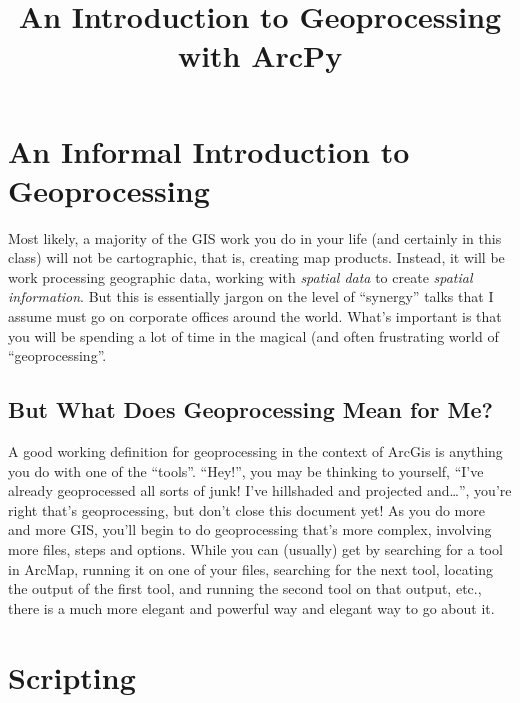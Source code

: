 \documentclass{article}
\begin{document}
\title{An Introduction to Geoprocessing with ArcPy}
\maketitle

\section{An Informal Introduction to Geoprocessing}
Most likely, a majority of the GIS work you do in your life (and certainly in this class) will not be cartographic, that is, creating map products.  Instead, it will be work processing geographic data, working with \textit{spatial data} to create \textit{spatial information}.  But this is essentially jargon on the level of ``synergy'' talks that I assume must go on corporate offices around the world.  What's important is that you will be spending a lot of time in the magical (and often frustrating world of ``geoprocessing''.  
\subsection{But What Does Geoprocessing Mean for Me?}
A good working definition for geoprocessing in the context of ArcGis is anything you do with one of the ``tools''.  ``Hey!'', you may be thinking to yourself, ``I've already geoprocessed all sorts of junk!  I've hillshaded and projected and\dots'', you're right that's geoprocessing, but don't close this document yet!  As you do more and more GIS, you'll begin to do geoprocessing that's more complex, involving more files, steps and options.  While you can (usually) get by searching for a tool in ArcMap, running it on one of your files, searching for the next tool, locating the output of the first tool, and running the second tool on that output, etc., there is a much more elegant and powerful way and elegant way to go about it.
\section{Scripting}
\end{document}
